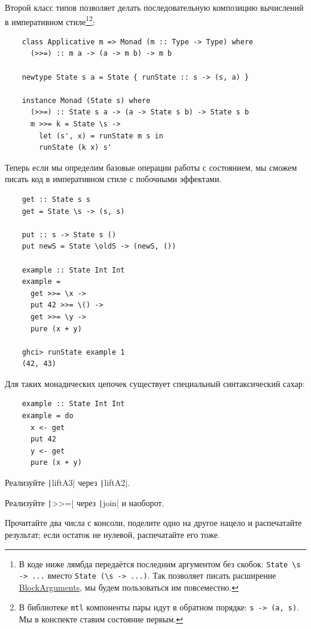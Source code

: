 Второй класс типов позволяет делать последовательную композицию вычислений в императивном стиле\footnote{В коде ниже лямбда передаётся последним аргументом без скобок: \texttt{State \textbackslash s -> ...} вместо \texttt{State (\textbackslash s -> ...)}. Так позволяет писать расширение \href{https://downloads.haskell.org/ghc/latest/docs/users_guide/exts/block_arguments.html}{BlockArguments}, мы будем пользоваться им повсеместно.}\footnote{В библиотеке \texttt{mtl} компоненты пары идут в обратном порядке: \texttt{s -> (a, s)}. Мы в конспекте ставим состояние первым.}:
\begin{verbatim}
    class Applicative m => Monad (m :: Type -> Type) where
      (>>=) :: m a -> (a -> m b) -> m b

    newtype State s a = State { runState :: s -> (s, a) }

    instance Monad (State s) where
      (>>=) :: State s a -> (a -> State s b) -> State s b
      m >>= k = State \s ->
        let (s', x) = runState m s in
        runState (k x) s'
\end{verbatim}

Теперь если мы определим базовые операции работы с состоянием, мы сможем писать код в императивном стиле с побочными эффектами.
\begin{verbatim}
    get :: State s s
    get = State \s -> (s, s)

    put :: s -> State s ()
    put newS = State \oldS -> (newS, ())

    example :: State Int Int
    example =
      get >>= \x ->
      put 42 >>= \() ->
      get >>= \y ->
      pure (x + y)

    ghci> runState example 1
    (42, 43)
\end{verbatim}

Для таких монадических цепочек существует специальный синтаксический сахар:
\begin{verbatim}
    example :: State Int Int
    example = do
      x <- get
      put 42
      y <- get
      pure (x + y)
\end{verbatim}

\begin{task}
    Реализуйте \texttt|liftA3| через \texttt|liftA2|.
\end{task}

\begin{task}
    Реализуйте \texttt|>>=| через \texttt|join| и наоборот.
\end{task}

\begin{task}
    Прочитайте два числа с консоли, поделите одно на другое нацело и распечатайте результат; если остаток не нулевой, распечатайте его тоже.
\end{task}
